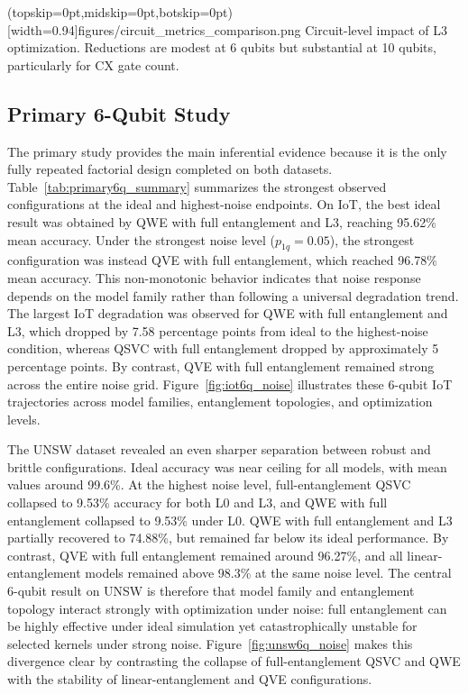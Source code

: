 \documentclass{ieeeaccess}
\begin{document}
\Figure[t!](topskip=0pt,midskip=0pt,botskip=0pt)[width=0.94\textwidth]{figures/circuit_metrics_comparison.png}
{Circuit-level impact of L3 optimization. Reductions are modest at 6 qubits but substantial at 10 qubits, particularly for CX gate count.\label{fig:circuit_metrics}}

\subsection{Primary 6-Qubit Study}

The primary study provides the main inferential evidence because it is the only fully repeated factorial design completed on both datasets. Table~\ref{tab:primary6q_summary} summarizes the strongest observed configurations at the ideal and highest-noise endpoints. On IoT, the best ideal result was obtained by QWE with full entanglement and L3, reaching 95.62\% mean accuracy. Under the strongest noise level ($p_{1q}=0.05$), the strongest configuration was instead QVE with full entanglement, which reached 96.78\% mean accuracy. This non-monotonic behavior indicates that noise response depends on the model family rather than following a universal degradation trend. The largest IoT degradation was observed for QWE with full entanglement and L3, which dropped by 7.58 percentage points from ideal to the highest-noise condition, whereas QSVC with full entanglement dropped by approximately 5 percentage points. By contrast, QVE with full entanglement remained strong across the entire noise grid. Figure~\ref{fig:iot6q_noise} illustrates these 6-qubit IoT trajectories across model families, entanglement topologies, and optimization levels.

The UNSW dataset revealed an even sharper separation between robust and brittle configurations. Ideal accuracy was near ceiling for all models, with mean values around 99.6\%. At the highest noise level, full-entanglement QSVC collapsed to 9.53\% accuracy for both L0 and L3, and QWE with full entanglement collapsed to 9.53\% under L0. QWE with full entanglement and L3 partially recovered to 74.88\%, but remained far below its ideal performance. By contrast, QVE with full entanglement remained around 96.27\%, and all linear-entanglement models remained above 98.3\% at the same noise level. The central 6-qubit result on UNSW is therefore that model family and entanglement topology interact strongly with optimization under noise: full entanglement can be highly effective under ideal simulation yet catastrophically unstable for selected kernels under strong noise. Figure~\ref{fig:unsw6q_noise} makes this divergence clear by contrasting the collapse of full-entanglement QSVC and QWE with the stability of linear-entanglement and QVE configurations.
\end{document}
